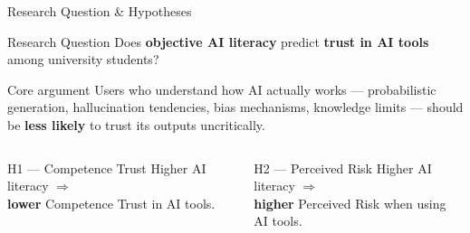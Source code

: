 \documentclass[10pt,aspectratio=169]{beamer}
\begin{document}
\begin{frame}{Research Question \& Hypotheses}
  \begin{block}{Research Question}
    Does \textbf{objective AI literacy} predict \textbf{trust in AI tools}
    among university students?
  \end{block}
  \pause
  \begin{alertblock}{Core argument}
    Users who understand how AI actually works --- probabilistic generation,
    hallucination tendencies, bias mechanisms, knowledge limits ---
    should be \textbf{less likely} to trust its outputs uncritically.
  \end{alertblock}
  \pause
  \begin{columns}[T]
    \begin{block}{H1 --- Competence Trust}
      Higher AI literacy $\Rightarrow$\\
      \textbf{lower} Competence Trust in AI tools.
    \end{block}
    \begin{block}{H2 --- Perceived Risk}
      Higher AI literacy $\Rightarrow$\\
      \textbf{higher} Perceived Risk when using AI tools.
    \end{block}
  \end{columns}
\end{frame}
\end{document}

